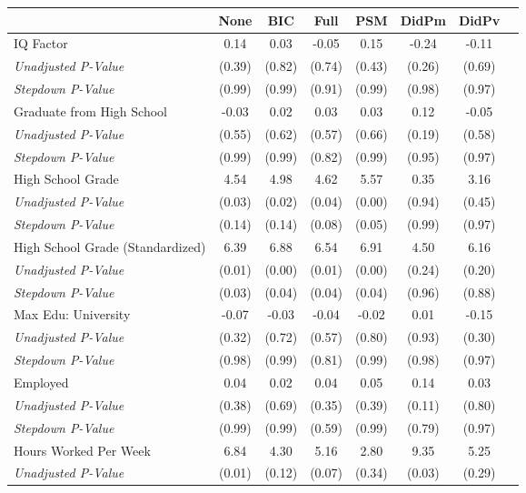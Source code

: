 \begin{tabular}{l c c c c c c c}
\toprule
 & None & BIC & Full & PSM & DidPm & DidPv \\
\midrule
IQ Factor & 0.14 & 0.03 & -0.05 & 0.15 & -0.24 & -0.11 \\
\quad \textit{Unadjusted P-Value} & (0.39) & (0.82) & (0.74) & (0.43) & (0.26) & (0.69) \\
\quad \textit{Stepdown P-Value} & (0.99) & (0.99) & (0.91) & (0.99) & (0.98) & (0.97) \\
Graduate from High School & -0.03 & 0.02 & 0.03 & 0.03 & 0.12 & -0.05 \\
\quad \textit{Unadjusted P-Value} & (0.55) & (0.62) & (0.57) & (0.66) & (0.19) & (0.58) \\
\quad \textit{Stepdown P-Value} & (0.99) & (0.99) & (0.82) & (0.99) & (0.95) & (0.97) \\
High School Grade & 4.54 & 4.98 & 4.62 & 5.57 & 0.35 & 3.16 \\
\quad \textit{Unadjusted P-Value} & (0.03) & (0.02) & (0.04) & (0.00) & (0.94) & (0.45) \\
\quad \textit{Stepdown P-Value} & (0.14) & (0.14) & (0.08) & (0.05) & (0.99) & (0.97) \\
High School Grade (Standardized) & 6.39 & 6.88 & 6.54 & 6.91 & 4.50 & 6.16 \\
\quad \textit{Unadjusted P-Value} & (0.01) & (0.00) & (0.01) & (0.00) & (0.24) & (0.20) \\
\quad \textit{Stepdown P-Value} & (0.03) & (0.04) & (0.04) & (0.04) & (0.96) & (0.88) \\
Max Edu: University & -0.07 & -0.03 & -0.04 & -0.02 & 0.01 & -0.15 \\
\quad \textit{Unadjusted P-Value} & (0.32) & (0.72) & (0.57) & (0.80) & (0.93) & (0.30) \\
\quad \textit{Stepdown P-Value} & (0.98) & (0.99) & (0.81) & (0.99) & (0.98) & (0.97) \\
Employed & 0.04 & 0.02 & 0.04 & 0.05 & 0.14 & 0.03 \\
\quad \textit{Unadjusted P-Value} & (0.38) & (0.69) & (0.35) & (0.39) & (0.11) & (0.80) \\
\quad \textit{Stepdown P-Value} & (0.99) & (0.99) & (0.59) & (0.99) & (0.79) & (0.97) \\
Hours Worked Per Week & 6.84 & 4.30 & 5.16 & 2.80 & 9.35 & 5.25 \\
\quad \textit{Unadjusted P-Value} & (0.01) & (0.12) & (0.07) & (0.34) & (0.03) & (0.29) \\

\end{tabular}
